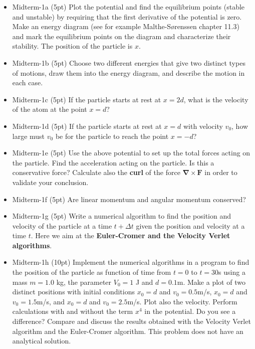 \documentclass[%
oneside,                 %
final,                   %
10pt]{article}
\begin{document}
\begin{itemize}
\item Midterm-1a (5pt) Plot the potential and find the  equilibrium points (stable and unstable) by requiring that the first derivative of the potential is zero. Make an energy diagram (see for example Malthe-Sørenssen chapter 11.3) and mark the equilibrium points on the diagram and characterize their stability. The position of the particle is $x$. 

\item Midterm-1b  (5pt) Choose two different energies that give two distinct types of motions, draw them into the energy diagram, and describe the motion in each case.

\item Midterm-1c (5pt) If the particle  starts at rest at $x=2d$, what is the velocity of the atom at the point $x=d$?

\item Midterm-1d (5pt) If the particle  starts at rest at $x=d$ with velocity $v_0$, how large must $v_0$ be for the  particle to reach the point $x=−d$?

\item Midterm-1e (5pt) Use the above potential to set up the total forces acting on the particle.  Find the acceleration acting on the particle. Is this a conservative force? Calculate also the \textbf{curl} of the force  $\bm{\nabla}\times \bm{F}$ in order to validate your conclusion. 

\item Midterm-1f (5pt) Are linear momentum and angular momentum conserved? 

\item Midterm-1g (5pt) Write a numerical algorithm to find the position and velocity of the particle at a time $t+\Delta t$ given the position and velocity at a time $t$. Here we aim at the \textbf{Euler-Cromer and the Velocity Verlet algorithms}.   

\item Midterm-1h (10pt) Implement the numerical algorithms in a program to find the position of the particle as function of time from $t=0$ to $t=30$s using a mass  $m=1.0$ kg, the parameter $V_0=1$ J and $d=0.1$m. Make a plot of two distinct positions with initial conditions $x_0=d$ and $v_0=0.5$m/s, $x_0=d$ and $v_0=1.5$m/s, and $x_0=d$ and $v_0=2.5$m/s. Plot also the velocity.  Perform calculations with and without the term $x^4$ in the potential. Do you see a difference? Compare and discuss the results obtained with the Velocity Verlet algorithm and the Euler-Cromer algorithm. This problem does not have an analytical solution. 


\end{itemize}
\end{document}
